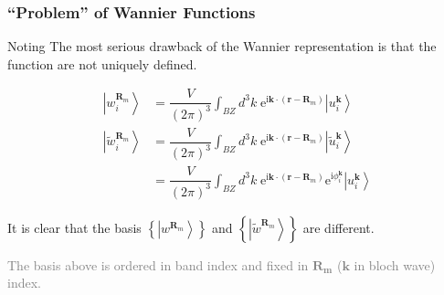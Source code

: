 \documentclass{beamer}
\begin{document}
  \begin{frame}
  \frametitle{``Problem'' of Wannier Functions}

  \begin{block}{Noting}
    The most serious drawback of the Wannier representation is that the function are not uniquely defined. 
  \end{block}

  \begin{equation*}
    \begin{aligned}
      \left|w_i^{\mathbf{R}_m}\right\rangle &= \dfrac{V}{(2\pi)^3}\int_{BZ}d^3k\;\mathrm{e}^{\mathrm{i}\mathbf{k}\cdot(\mathbf{r}-\mathbf{R}_m)}\left|u_i^{\mathbf{k}}\right\rangle\\
      \left|\tilde{w}_i^{\mathbf{R}_m}\right\rangle &= \dfrac{V}{(2\pi)^3}\int_{BZ}d^3k\;\mathrm{e}^{\mathrm{i}\mathbf{k}\cdot(\mathbf{r}-\mathbf{R}_m)}\left|\tilde{u}_i^{\mathbf{k}}\right\rangle\\
      &= \dfrac{V}{(2\pi)^3}\int_{BZ}d^3k\;\mathrm{e}^{\mathrm{i}\mathbf{k}\cdot(\mathbf{r}-\mathbf{R}_m)}\mathrm{e}^{\mathrm{i}\phi_i^{\mathbf{k}}}\left|u_i^{\mathbf{k}}\right\rangle
    \end{aligned}
  \end{equation*}

  It is clear that the basis \(\left\{\left|w^{\mathbf{R}_m}\right\rangle\right\}\) and \(\left\{\left|\tilde{w}^{\mathbf{R}_m}\right\rangle\right\}\) are different.

    \textcolor{gray}{The basis above is ordered in band index and fixed in \(\mathbf{R_m}\) (\(\mathbf{k}\) in bloch wave) index.}
  \end{frame}
\end{document}
